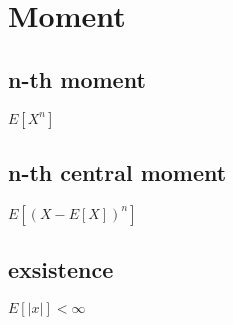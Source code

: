 \section{Moment}
    \subsection*{n-th moment}
        $E[X^n]$
    \subsection*{n-th central moment}
        $E[(X-E[X])^n]$

    \subsection*{exsistence}
        $E[|x|] < \infty$
    

